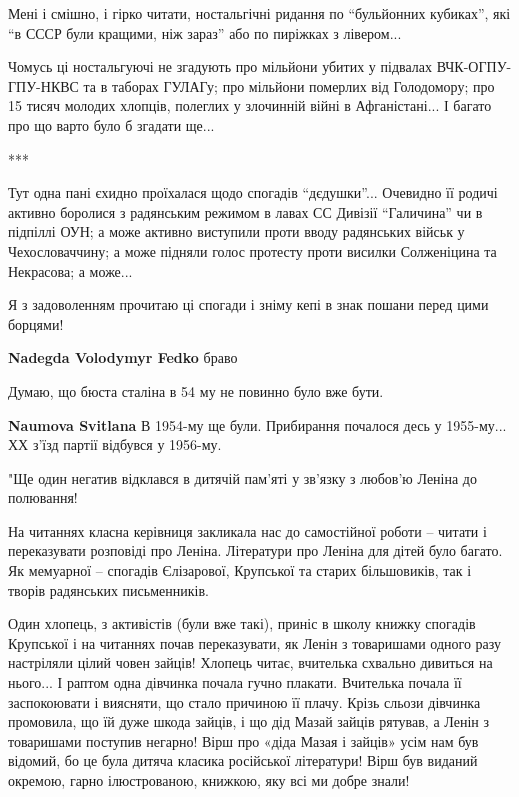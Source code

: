 \begin{itemize}
Мені і смішно, і гірко читати, ностальгічні ридання по \enquote{бульйонних кубиках},
які \enquote{в СССР були кращими, ніж зараз} або по пиріжках з лівером...

Чомусь ці ностальгуючі не згадують про мільйони убитих у підвалах
ВЧК-ОГПУ-ГПУ-НКВС та в таборах ГУЛАГу; про мільйони померлих від Голодомору;
про 15 тисяч молодих хлопців, полеглих у злочинній війні в Афганістані... І
багато про що варто було б згадати ще...

***

Тут одна пані єхидно проїхалася щодо спогадів \enquote{дєдушки}... Очевидно її родичі
активно боролися з радянським режимом в лавах СС Дивізії \enquote{Галичина} чи в
підпіллі ОУН; а може активно виступили проти вводу радянських військ у
Чехословаччину; а може підняли голос протесту проти висилки Солженіцина та
Некрасова; а може...

Я з задоволенням прочитаю ці спогади і зніму кепі в знак пошани перед цими
борцями!

\textbf{Nadegda Volodymyr Fedko} браво

Думаю, що бюста сталіна в 54 му не повинно було вже бути.

\textbf{Naumova Svitlana} В 1954-му ще були. Прибирання почалося десь у 1955-му... ХХ з'їзд партії відбувся у 1956-му.


"Ще один негатив відклався в дитячій пам’яті у зв’язку з любов’ю Леніна до полювання!

На читаннях класна керівниця закликала нас до самостійної роботи – читати і
переказувати розповіді про Леніна. Літератури про Леніна для дітей було багато.
Як мемуарної – спогадів Єлізарової, Крупської та старих більшовиків, так і
творів радянських письменників.

Один хлопець, з активістів (були вже такі), приніс в школу книжку спогадів
Крупської і на читаннях почав переказувати, як Ленін з товаришами одного разу
настріляли цілий човен зайців! Хлопець читає, вчителька схвально дивиться на
нього... І раптом одна дівчинка почала гучно плакати. Вчителька почала її
заспокоювати і виясняти, що стало причиною її плачу. Крізь сльози дівчинка
промовила, що їй дуже шкода зайців, і що дід Мазай зайців рятував, а Ленін з
товаришами поступив негарно! Вірш про «діда Мазая і зайців» усім нам був
відомий, бо це була дитяча класика російської літератури! Вірш був виданий
окремою, гарно ілюстрованою, книжкою, яку всі ми добре знали!


\end{itemize}
